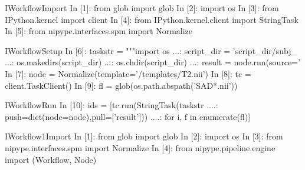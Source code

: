 \documentclass[portrait,final]{baposter}
\begin{document}
\begin{poster}
{\vspace{0.5em}
  }

\begin{SaveVerbatim}{IWorkflowImport}
In [1]: from glob import glob
In [2]: import os
In [3]: from IPython.kernel import client
In [4]: from IPython.kernel.client import StringTask
In [5]: from nipype.interfaces.spm import Normalize
\end{SaveVerbatim}

\begin{SaveVerbatim}{IWorkflowSetup}
In [6]: taskstr = """import os
   ...: script_dir = 'script_dir/subj_%
   ...: os.makedirs(script_dir)
   ...: os.chdir(script_dir)
   ...: result = node.run(source='%
In [7]: node = Normalize(template='/templates/T2.nii')
In [8]: tc = client.TaskClient()
In [9]: fl = glob(os.path.abspath('SAD*.nii'))
\end{SaveVerbatim}

\begin{SaveVerbatim}{IWorkflowRun}
In [10]: ids = [tc.run(StringTask(taskstr%
   ....:        push=dict(node=node),pull=['result']))
   ....:        for i, f in enumerate(fl)]
\end{SaveVerbatim}


\begin{SaveVerbatim}{IWorkflow1Import}
In [1]: from glob import glob
In [2]: import os
In [3]: from nipype.interfaces.spm import Normalize
In [4]: from nipype.pipeline.engine import (Workflow, 
                                            Node)
\end{SaveVerbatim}


\end{poster}
\end{document}
